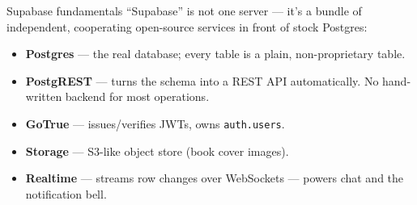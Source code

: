 \documentclass[aspectratio=169,11pt]{beamer}
\newcommand{\code}[1]{\textcolor{olkTealDark}{\texttt{#1}}}
\begin{document}
\begin{frame}{Supabase fundamentals}
  ``Supabase'' is not one server --- it's a bundle of independent, cooperating open-source services in front of stock Postgres:
  \begin{itemize}
    \item \textbf{Postgres} --- the real database; every table is a plain, non-proprietary table.
    \item \textbf{PostgREST} --- turns the schema into a REST API automatically. No hand-written backend for most operations.
    \item \textbf{GoTrue} --- issues/verifies JWTs, owns \code{auth.users}.
    \item \textbf{Storage} --- S3-like object store (book cover images).
    \item \textbf{Realtime} --- streams row changes over WebSockets --- powers chat and the notification bell.
  \end{itemize}
\end{frame}
\end{document}
